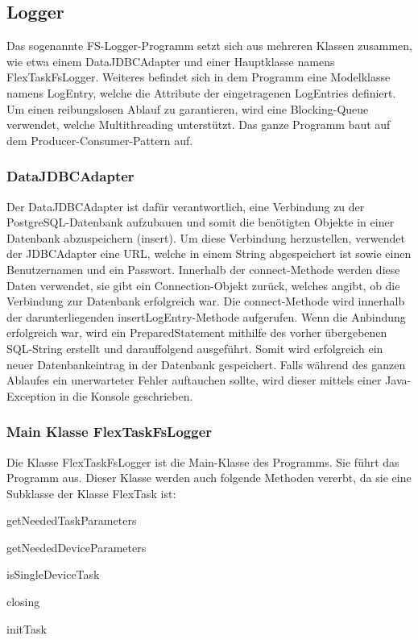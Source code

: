 \subsection{Logger}
Das sogenannte FS-Logger-Programm setzt sich aus mehreren Klassen zusammen, wie etwa einem DataJDBCAdapter und einer Hauptklasse namens FlexTaskFsLogger. Weiteres befindet sich in dem Programm eine Modelklasse namens LogEntry, welche die Attribute der eingetragenen LogEntries definiert. Um einen reibungslosen Ablauf zu garantieren, wird eine Blocking-Queue verwendet, welche Multithreading unterstützt. Das ganze Programm baut auf dem Producer-Consumer-Pattern auf.          
 
\subsubsection{DataJDBCAdapter}
Der DataJDBCAdapter ist dafür verantwortlich, eine Verbindung zu der PostgreSQL-Datenbank aufzubauen und somit die benötigten Objekte in einer Datenbank abzuspeichern (insert). Um diese Verbindung herzustellen, verwendet der JDBCAdapter eine URL, welche in einem String abgespeichert ist sowie einen Benutzernamen und ein Passwort. Innerhalb der connect-Methode werden diese Daten verwendet, sie gibt ein Connection-Objekt zurück, welches angibt, ob die Verbindung zur Datenbank erfolgreich war. Die connect-Methode wird innerhalb der darunterliegenden insertLogEntry-Methode aufgerufen. Wenn die Anbindung erfolgreich war, wird ein PreparedStatement mithilfe des vorher übergebenen SQL-String erstellt und darauffolgend ausgeführt. Somit wird erfolgreich ein neuer Datenbankeintrag in der Datenbank gespeichert. Falls während des ganzen Ablaufes ein unerwarteter Fehler auftauchen sollte, wird dieser mittels einer Java-Exception in die Konsole geschrieben.
 
\subsubsection{Main Klasse FlexTaskFsLogger}
Die Klasse FlexTaskFsLogger ist die Main-Klasse des Programms. Sie führt das Programm aus. Dieser Klasse werden auch folgende Methoden vererbt, da sie eine Subklasse der Klasse FlexTask ist:
\begin{compactitem}
    \item getNeededTaskParameters
    \item getNeededDeviceParameters
    \item isSingleDeviceTask
    \item closing
    \item initTask
\end{compactitem}
 
